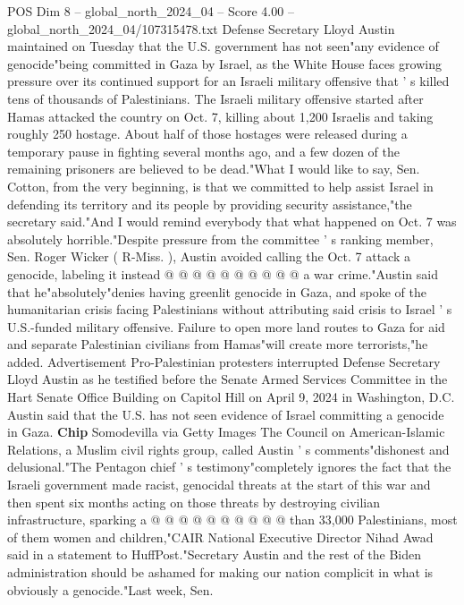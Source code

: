 \begin{textsample}{POS Dim 8 – global\_north\_2024\_04 – Score 4.00 – global\_north\_2024\_04/107315478.txt}  \label{ex:f8_pos_320}
Defense Secretary Lloyd Austin maintained on Tuesday that the U.S. government has not seen"any evidence of genocide"being committed in Gaza by Israel, as the White House faces growing pressure over its continued support for an Israeli military offensive that ' s killed tens of thousands of Palestinians.
The Israeli military offensive started after Hamas attacked the country on Oct. 7, killing about 1,200 Israelis and taking roughly 250 hostage.
About half of those hostages were released during a temporary pause in fighting several months ago, and a few dozen of the remaining prisoners are believed to be dead."What I would like to say, Sen.
Cotton, from the very beginning, is that we committed to help assist Israel in defending its territory and its people by providing security assistance,"the secretary said."And I would remind everybody that what happened on Oct. 7 was absolutely horrible."Despite pressure from the committee ' s ranking member, Sen.
Roger Wicker ( R-Miss. ), Austin avoided calling the Oct. 7 attack a genocide, labeling it instead @ @ @ @ @ @ @ @ @ @ a war crime."Austin said that he"absolutely"denies having greenlit genocide in Gaza, and spoke of the humanitarian crisis facing Palestinians without attributing said crisis to Israel ' s U.S.-funded military offensive.
Failure to open more land routes to Gaza for aid and separate Palestinian civilians from Hamas"will create more terrorists,"he added.
Advertisement Pro-Palestinian protesters interrupted Defense Secretary Lloyd Austin as he testified before the Senate Armed Services Committee in the Hart Senate Office Building on Capitol Hill on April 9, 2024 in Washington, D.C.
Austin said that the U.S. has not seen evidence of Israel committing a genocide in Gaza. \textbf{Chip} Somodevilla via Getty Images The Council on American-Islamic Relations, a Muslim civil rights group, called Austin ' s comments"dishonest and delusional."The Pentagon chief ' s testimony"completely ignores the fact that the Israeli government made racist, genocidal threats at the start of this war and then spent six months acting on those threats by destroying civilian infrastructure, sparking a @ @ @ @ @ @ @ @ @ @ than 33,000 Palestinians, most of them women and children,"CAIR National Executive Director Nihad Awad said in a statement to HuffPost."Secretary Austin and the rest of the Biden administration should be ashamed for making our nation complicit in what is obviously a genocide."Last week, Sen.

\end{textsample}
